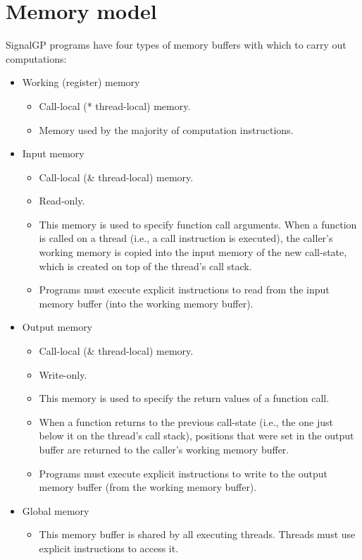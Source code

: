 \documentclass[
]{book}
\providecommand{\tightlist}{%
  \setlength{\itemsep}{0pt}\setlength{\parskip}{0pt}}
\begin{document}
\hypertarget{memory-model}{%
\section{Memory model}\label{memory-model}}

SignalGP programs have four types of memory buffers with which to carry out computations:

\begin{itemize}
\tightlist
\item
  Working (register) memory

  \begin{itemize}
  \tightlist
  \item
    Call-local (* thread-local) memory.
  \item
    Memory used by the majority of computation instructions.
  \end{itemize}
\item
  Input memory

  \begin{itemize}
  \tightlist
  \item
    Call-local (\& thread-local) memory.
  \item
    Read-only.
  \item
    This memory is used to specify function call arguments. When a function is called on a thread (i.e.,
    a call instruction is executed), the caller's working memory is copied into the input memory of
    the new call-state, which is created on top of the thread's call stack.
  \item
    Programs must execute explicit instructions to read from the input memory buffer (into the working
    memory buffer).
  \end{itemize}
\item
  Output memory

  \begin{itemize}
  \tightlist
  \item
    Call-local (\& thread-local) memory.
  \item
    Write-only.
  \item
    This memory is used to specify the return values of a function call.
  \item
    When a function returns to the previous call-state (i.e., the one just below it on the thread's
    call stack), positions that were set in the output buffer are returned to the caller's working memory
    buffer.
  \item
    Programs must execute explicit instructions to write to the output memory buffer (from the working
    memory buffer).
  \end{itemize}
\item
  Global memory

  \begin{itemize}
  \tightlist
  \item
    This memory buffer is shared by all executing threads. Threads must use explicit instructions to access it.
  \end{itemize}
\end{itemize}
\end{document}
